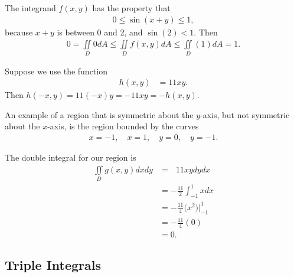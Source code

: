 \documentclass{article}
\begin{document}
\item %
The integrand $f(x,y)$ has the property that 
\begin{align*}
  0 \le \sin(x+y) \le 1,
\end{align*}
because $x+y$ is between 0 and 2, and $\sin(2) < 1$. Then 
\begin{align*}
  0 = \iint\limits_D 0 dA  \le  \iint\limits_D f(x,y) dA \le  \iint\limits_D (1) dA = 1.
\end{align*}
\item %
\BEN
\item 
Suppose we use the function
\begin{align*}
 h(x,y) & = 11xy.
\end{align*}
Then $h(-x,y) = 11(-x)y = -11xy = -h(x,y)$. 
\item An example of a region that is symmetric about the $y$-axis, but not symmetric about the $x$-axis, is the region bounded by the curves
\begin{align*}
  x = -1,  \quad x = 1, \quad y = 0, \quad y = - 1.
\end{align*}
\item The double integral for our region is
\begin{align*}
  \iint\limits_D g(x,y) dxdy 
  &=  \mathop{\int_{-1}^1 \! \int_{-1}^0} 11xy dydx\\
  &=  -\frac{11}{2} \int_{-1}^1 x dx\\
  &=  -\frac{11}{4} \Big(x^2 \Big)\Big|_{-1}^{1} \\
  &=  -\frac{11}{4} (0)\\
  &= 0.
\end{align*}
\EEN
\EEN %
\subsection{Triple Integrals}
\end{document}
